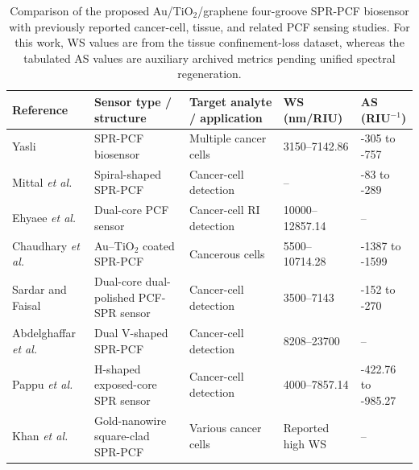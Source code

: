 \documentclass[5p,times,twocolumn]{elsarticle}
\begin{document}
\begin{table}[!t]
\centering
\caption{Comparison of the proposed Au/TiO$_2$/graphene four-groove SPR-PCF biosensor with previously reported cancer-cell, tissue, and related PCF sensing studies. For this work, WS values are from the tissue confinement-loss dataset, whereas the tabulated AS values are auxiliary archived metrics pending unified spectral regeneration.}
\label{tab:comparison_previous_combined}
\scriptsize
\setlength{\tabcolsep}{3.5pt}
\renewcommand{\arraystretch}{1.18}
\begin{tabularx}{\textwidth}{@{}p{} p{} p{} p{} p{}@{}}
\toprule
\textbf{Reference} & \textbf{Sensor type / structure} & \textbf{Target analyte / application} & \textbf{WS (nm/RIU)} & \textbf{AS (RIU$^{-1}$)} \\
\midrule
Yasli~\cite{Yasli2021Cancer} 
& SPR-PCF biosensor 
& Multiple cancer cells 
& 3150--7142.86 
& -305 to -757 \\

Mittal \textit{et al.}~\cite{Mittal2023Photonics} 
& Spiral-shaped SPR-PCF 
& Cancer-cell detection 
& -- 
& -83 to -289 \\

Ehyaee \textit{et al.}~\cite{Ehyaee2023EPJ} 
& Dual-core PCF sensor 
& Cancer-cell RI detection 
& 10000--12857.14 
& -- \\

Chaudhary \textit{et al.}~\cite{Chaudhary2022TNB} 
& Au--TiO$_2$ coated SPR-PCF 
& Cancerous cells 
& 5500--10714.28 
& -1387 to -1599 \\

Sardar and Faisal~\cite{Sardar2024JSEN} 
& Dual-core dual-polished PCF-SPR sensor 
& Cancer-cell detection 
& 3500--7143 
& -152 to -270 \\

Abdelghaffar \textit{et al.}~\cite{Abdelghaffar2024JOSAB} 
& Dual V-shaped SPR-PCF 
& Cancer-cell detection 
& 8208--23700 
& -- \\

Pappu \textit{et al.}~\cite{Pappu2024Plasmonics} 
& H-shaped exposed-core SPR sensor 
& Cancer-cell detection 
& 4000--7857.14 
& -422.76 to -985.27 \\

Khan \textit{et al.}~\cite{Khan2024GoldNanowire} 
& Gold-nanowire square-clad SPR-PCF 
& Various cancer cells 
& Reported high WS 
& -- \\


\end{tabularx}
\end{table}
\end{document}
